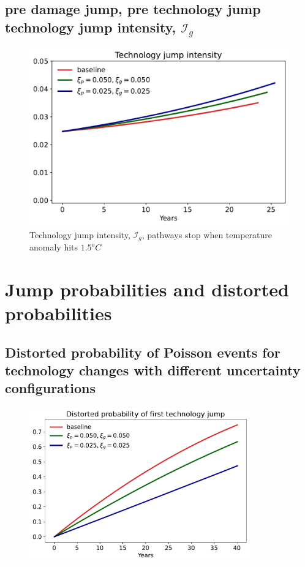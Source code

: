 \documentclass[12pt]{article}
\begin{document}
\subsection{pre damage jump, pre technology jump technology jump intensity, $\mathcal{I}_g$}
\begin{figure}[H]
	\centering
	\includegraphics[width=\textwidth]{../figures/xi_comparison/20damage/Lt_1p5.pdf}
	\caption{Technology jump intensity, $\mathcal{I}_g$, pathways stop when temperature anomaly hits $1.5^o C$}
\end{figure}

\section{Jump probabilities and distorted probabilities}

\subsection{Distorted probability of Poisson events for technology changes with different uncertainty configurations}


\begin{figure}[H]
	\centering
	\includegraphics[width=0.85\textwidth]{../figures/xi_comparison/20damage/Tech_jump_first.pdf}
\end{figure}
\end{document}
